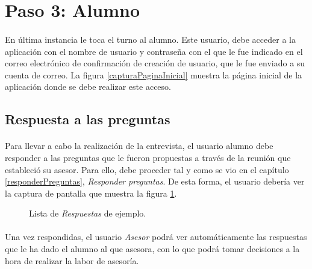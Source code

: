 \section{Paso 3: Alumno}

  \paragraph{}En última instancia le toca el turno al alumno. Este usuario,
  debe acceder a la aplicación con el nombre de usuario y contraseña con el que
  le fue indicado en el correo electrónico de confirmación de creación de
  usuario, que le fue enviado a su cuenta de correo. La figura
  \ref{capturaPaginaInicial} muestra la página inicial de la aplicación donde se
  debe realizar este acceso.

  \subsection{Respuesta a las preguntas}

  \paragraph{}Para llevar a cabo la realización de la entrevista, el usuario
  alumno debe responder a las preguntas que le fueron propuestas a través de la
  reunión que estableció su asesor. Para ello, debe proceder tal y como se vio
  en el capítulo \ref{responderPreguntas}, \textit{Responder preguntas}. De esta
  forma, el usuario debería ver la captura de pantalla que muestra la figura
  \ref{ejemploRespuestas}.

  \begin{figure}[!ht]
    \begin{center}
      \caption{Lista de \textit{Respuestas} de ejemplo.}
      \label{ejemploRespuestas}
    \end{center}
  \end{figure}

  \paragraph{}Una vez respondidas, el usuario \textit{Asesor} podrá ver
  automáticamente las respuestas que le ha dado el alumno al que asesora, con lo
  que podrá tomar decisiones a la hora de realizar la labor de asesoría.